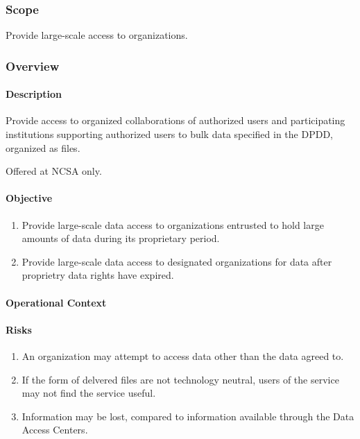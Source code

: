﻿\subsubsection{Scope}


Provide large-scale access to organizations.

\subsubsection{Overview}

\paragraph{Description}

Provide access to organized collaborations of authorized users and
participating institutions supporting authorized users to bulk data
specified in the DPDD, organized as files.

Offered at NCSA only.

\paragraph{Objective}

\begin{enumerate}

\item Provide large-scale data access to organizations entrusted to hold large
amounts of data during its proprietary period.

\item Provide large-scale data access to designated organizations for data after
proprietry data rights have expired.

\end{enumerate}

\paragraph{Operational Context}

\paragraph{Risks}

\begin{enumerate}

\item An organization may attempt to access data other than the data agreed to.

\item If the form of delvered files are not technology neutral, users of the  service may not find the
service useful.

\item Information may be lost, compared to information available through the Data Access Centers. 

\end{enumerate}

